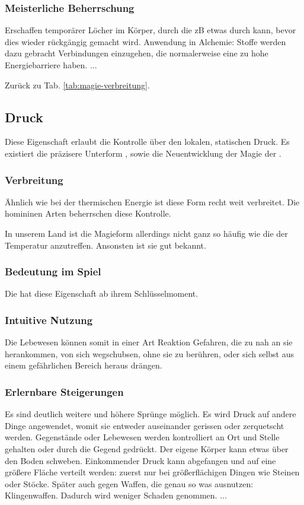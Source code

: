\subsubsection{Meisterliche Beherrschung} 
\begin{outline}
	\1 Erschaffen temporärer Löcher im Körper, durch die zB etwas durch kann, bevor dies wieder rückgängig gemacht wird.
	\1 Anwendung in Alchemie: Stoffe werden dazu gebracht Verbindungen einzugehen, die normalerweise eine zu hohe Energiebarriere haben.
	\1 ...
\end{outline}
Zurück zu Tab. \ref{tab:magie-verbreitung}.



\subsection{Druck}\label{sec:druckmagie}
Diese Eigenschaft erlaubt die Kontrolle über den lokalen, statischen Druck. 
Es existiert die präzisere Unterform , sowie die Neuentwicklung der Magie der .

\subsubsection{Verbreitung}
Ähnlich wie bei der thermischen Energie ist diese Form recht weit verbreitet. 
Die homininen Arten beherrschen diese Kontrolle. 

In unserem Land ist die Magieform allerdings nicht ganz so häufig wie die der Temperatur anzutreffen. 
Ansonsten ist sie gut bekannt.

\subsubsection{Bedeutung im Spiel}
Die  hat diese Eigenschaft ab ihrem Schlüsselmoment. %

\subsubsection{Intuitive Nutzung}
Die Lebewesen können somit in einer Art Reaktion Gefahren, die zu nah an sie herankommen, von sich wegschubsen, ohne sie zu berühren, oder sich selbst aus einem gefährlichen Bereich heraus drängen. 

\subsubsection{Erlernbare Steigerungen}
\begin{outline}
	\1 Es sind deutlich weitere und höhere Sprünge möglich.
	\1 Es wird Druck auf andere Dinge angewendet, womit sie entweder auseinander gerissen oder zerquetscht werden.
	\1 Gegenstände oder Lebewesen werden kontrolliert an Ort und Stelle gehalten oder durch die Gegend gedrückt.
	\1 Der eigene Körper kann etwas über den Boden schweben.
	\1 Einkommender Druck kann abgefangen und auf eine größere Fläche verteilt werden: zuerst nur bei größerflächigen Dingen wie Steinen oder Stöcke. 
	Später auch gegen Waffen, die genau so was ausnutzen: Klingenwaffen. 
	Dadurch wird weniger Schaden genommen.
	\1 ...
\end{outline}

